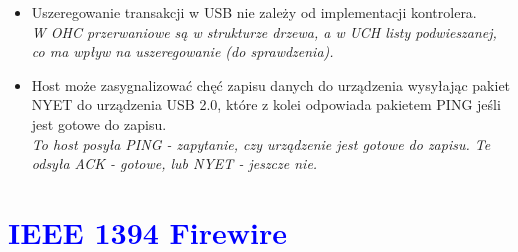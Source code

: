 \begin{itemize}
	\item \textcolor{nie}{Uszeregowanie transakcji w USB nie zależy od implementacji kontrolera.} \\
	{\small \emph{W OHC przerwaniowe są w strukturze drzewa, a w UCH listy podwieszanej, co ma wpływ na uszeregowanie (do sprawdzenia).}}
	
	\item \textcolor{nie}{Host może zasygnalizować chęć zapisu danych do urządzenia wysyłając pakiet NYET do urządzenia USB 2.0, które z kolei odpowiada pakietem PING jeśli jest gotowe do zapisu.} \\
	{\small \emph{To host posyła PING - zapytanie, czy urządzenie jest gotowe do zapisu. Te odsyła ACK - gotowe, lub NYET - jeszcze nie.}}
	
\end{itemize}

\section{\textcolor{blue}{IEEE 1394 Firewire}}
